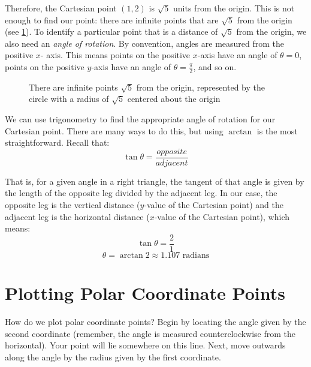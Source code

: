 Therefore, the Cartesian point $(1, 2)$ is $\sqrt{5}$ units from the origin. 
This is not enough to find our point: there are infinite points that are 
$\sqrt{5}$ from the origin (see \ref{fig:circle}). To identify a particular point 
that is a distance of $\sqrt{5}$ from the origin, we also need an \textit{
angle of rotation}. By convention, angles are measured from the positive $x$-
axis. This means points on the positive $x$-axis have an angle of $\theta = 
0$, points on the positive $y$-axis have an angle of $\theta = \frac{\pi}{2}$, 
and so on. 

\begin{figure}[H]
\centering
    \caption{There are infinite points $\sqrt{5}$ from the origin, represented 
    by the circle with a radius of $\sqrt{5}$ centered about the origin}
    \label{fig:circle}
    \end{figure}

We can use trigonometry to find the appropriate angle of rotation for our 
Cartesian point. There are many ways to do this, but using $\arctan$ is the 
most straightforward. Recall that:
$$\tan{\theta} = \frac{opposite}{adjacent}$$

That is, for a given angle in a right triangle, the tangent of that angle is 
given by the length of the opposite leg divided by the adjacent leg. In our 
case, the opposite leg is the vertical distance ($y$-value of the Cartesian 
point) and the adjacent leg is the horizontal distance ($x$-value of the 
Cartesian point), which means:
$$\tan{\theta} = \frac{2}{1}$$
$$\theta = \arctan{2} \approx 1.107\text{ radians}$$

\section{Plotting Polar Coordinate Points}
How do we plot polar coordinate points? Begin by locating the angle given by the second coordinate (remember, the angle is measured counterclockwise from the horizontal). Your point will lie somewhere on this line. Next, move outwards along the angle by the radius given by the first coordinate. 

